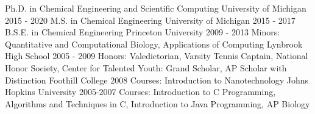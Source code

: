 \begin{cventries}
\ifextended
  \cventry
    {Ph.D. in Chemical Engineering and Scientific Computing} %
    {University of Michigan} %
    {} %
    {2015 - 2020 } %
    {
    }\fi
\ifextended
  \cventry
    {M.S. in Chemical Engineering} %
    {University of Michigan} %
    {} %
    {2015 - 2017 } %
    {
    }\fi
  \cventry
    {B.S.E. in Chemical Engineering} %
    {Princeton University} %
    {} %
    {2009 - 2013 } %
    {\scriptsize Minors: Quantitative and Computational Biology, Applications of Computing
    }
  \cventry
    {} %
    {Lynbrook High School} %
    {} %
    {2005 - 2009 } %
    {\scriptsize Honors: Valedictorian, Varsity Tennis Captain, National Honor Society, Center for Talented Youth: Grand Scholar, AP Scholar with Distinction
    }
  \cventry
    {} %
    {Foothill College} %
    {} %
    {2008 } %
    {\scriptsize Courses: Introduction to Nanotechnology
    }
  \cventry
    {} %
    {Johns Hopkins University} %
    {} %
    {2005-2007 } %
    {\scriptsize Courses: Introduction to C Programming, Algorithms and Techniques in C, Introduction to Java Programming, AP Biology
    }
\end{cventries}